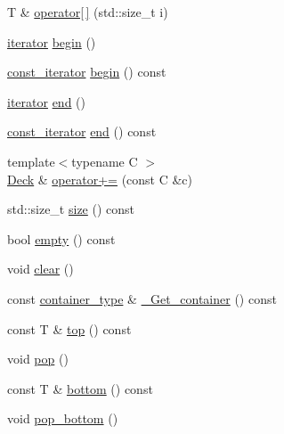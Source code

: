 \begin{DoxyCompactItemize}
\item 
T \& \hyperlink{classpan_1_1detail_1_1_deck_ab9d32067fc206985aa116c47cb061809}{operator\mbox{[}$\,$\mbox{]}} (std\+::size\+\_\+t i)
\item 
\hyperlink{classpan_1_1detail_1_1_deck_a8b4adeae73d035d2bbe3fdfcb65ed1b1}{iterator} \hyperlink{classpan_1_1detail_1_1_deck_a32ce67b19c19b9760a939197f32bdbd7}{begin} ()
\item 
\hyperlink{classpan_1_1detail_1_1_deck_addc18d2f40aa396f6358bb019d088728}{const\+\_\+iterator} \hyperlink{classpan_1_1detail_1_1_deck_aa2a28d431e67eb803c7812e8893c1fdf}{begin} () const
\item 
\hyperlink{classpan_1_1detail_1_1_deck_a8b4adeae73d035d2bbe3fdfcb65ed1b1}{iterator} \hyperlink{classpan_1_1detail_1_1_deck_a05820009bdfba814a1a2bc56bce9cbb8}{end} ()
\item 
\hyperlink{classpan_1_1detail_1_1_deck_addc18d2f40aa396f6358bb019d088728}{const\+\_\+iterator} \hyperlink{classpan_1_1detail_1_1_deck_a612c8366fcec0ee40c617d7585a57726}{end} () const
\item 
{\footnotesize template$<$typename C $>$ }\\\hyperlink{classpan_1_1detail_1_1_deck}{Deck} \& \hyperlink{classpan_1_1detail_1_1_deck_a51483b834bcae54ce386de8dbd646f11}{operator+=} (const C \&c)
\item 
std\+::size\+\_\+t \hyperlink{classpan_1_1detail_1_1_deck_a4ccde71b3fae9ce2ea3da99ad500c9ba}{size} () const
\item 
bool \hyperlink{classpan_1_1detail_1_1_deck_a23b456cde20b1a67c894cff73a4d67ee}{empty} () const
\item 
void \hyperlink{classpan_1_1detail_1_1_deck_afbcc141b70fe8cf56f66b1e4d11bd4f4}{clear} ()
\item 
const \hyperlink{classpan_1_1detail_1_1_deck_a847d973e0469dd7aef881b3863c37cff}{container\+\_\+type} \& \hyperlink{classpan_1_1detail_1_1_deck_a7ab128dae3cf7c12cda581a129163948}{\+\_\+\+Get\+\_\+container} () const
\item 
const T \& \hyperlink{classpan_1_1detail_1_1_deck_a12ce80897ff102e94279a81584b29e2d}{top} () const
\item 
void \hyperlink{classpan_1_1detail_1_1_deck_ae40b687cc780fbff6411d4679e54b872}{pop} ()
\item 
const T \& \hyperlink{classpan_1_1detail_1_1_deck_a44054712651d2f78a7c6c238be9dbdcb}{bottom} () const
\item 
void \hyperlink{classpan_1_1detail_1_1_deck_a4d5fc95df8f273d0ec51078acd7df69c}{pop\+\_\+bottom} ()

\end{DoxyCompactItemize}
